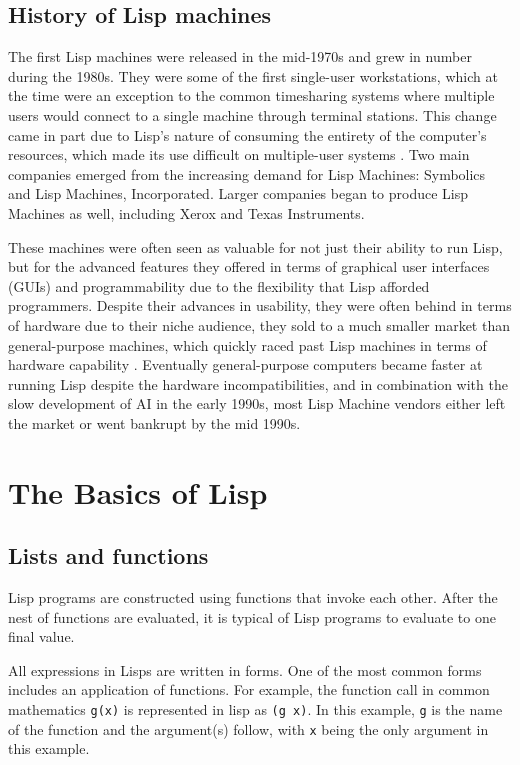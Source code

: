 \documentclass[journal]{IEEEtran}
\begin{document}
\subsection{History of Lisp machines}
The first Lisp machines were released in the mid-1970s and grew in number during the 1980s. They were some of the first single-user workstations, which at the time were an exception to the common timesharing systems where multiple users would connect to a single machine through terminal stations. This change came in part due to Lisp's nature of consuming the entirety of the computer's resources, which made its use difficult on multiple-user systems \cite{andromeda}. Two main companies emerged from the increasing demand for Lisp Machines: Symbolics and Lisp Machines, Incorporated. Larger companies began to produce Lisp Machines as well, including Xerox and Texas Instruments. 

These machines were often seen as valuable for not just their ability to run Lisp, but for the advanced features they offered in terms of graphical user interfaces (GUIs) and programmability due to the flexibility that Lisp afforded programmers. Despite their advances in usability, they were often behind in terms of hardware due to their niche audience, they sold to a much smaller market than general-purpose machines, which quickly raced past Lisp machines in terms of hardware capability \cite{withington}. Eventually general-purpose computers became faster at running Lisp despite the hardware incompatibilities, and in combination with the slow development of AI in the early 1990s, most Lisp Machine vendors either left the market or went bankrupt by the mid 1990s.

\section{The Basics of Lisp}

\subsection{Lists and functions}
Lisp programs are constructed using functions that invoke each other. After the nest of functions are evaluated, it is typical of Lisp programs to evaluate to one final value.

All expressions in Lisps are written in forms. One of the most common forms includes an application of functions. For example, the function call in common mathematics \texttt{g(x)} is represented in lisp as \texttt{(g x)}. In this example, \texttt{g} is the name of the function and the argument(s) follow, with \texttt{x} being the only argument in this example.
\end{document}
